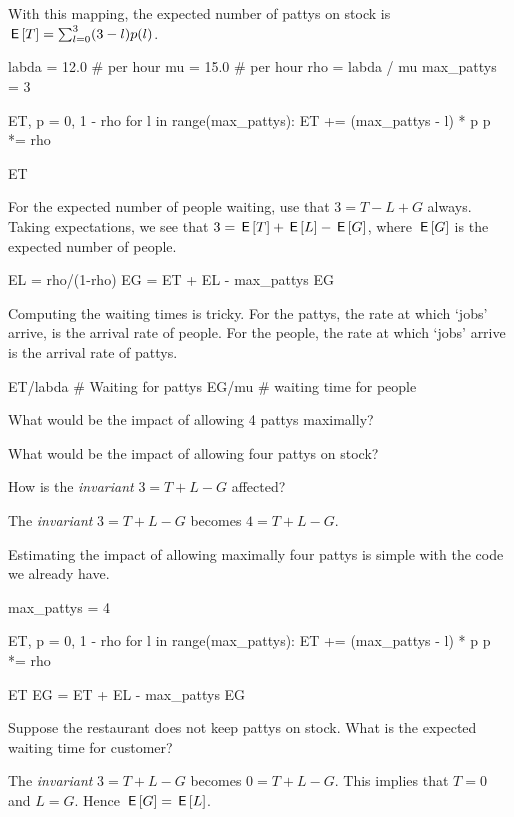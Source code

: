 \documentclass[queueing-book.tex]{subfiles}
\begin{document}
\begin{exercise}
\begin{solution}
With this mapping, the expected number of pattys on stock is $\,\mathsf{E}\left[T\right] =  \sum_{l=0}^3 (3-l)p(l)$.
\begin{pyconsole}[taxis]
labda = 12.0  # per hour
mu = 15.0  # per hour
rho = labda / mu
max_pattys = 3

ET, p = 0, 1 - rho
for l in range(max_pattys):
    ET += (max_pattys - l) * p
    p *= rho

ET
\end{pyconsole}
For the expected number of people waiting, use  that $3=T-L+G$ always.
Taking expectations, we see that $3 = \,\mathsf{E}\left[T\right] + \,\mathsf{E}\left[L\right] - \,\mathsf{E}\left[G\right]$, where $\,\mathsf{E}\left[G\right]$ is the expected number of people.
\begin{pyconsole}[taxis]
EL = rho/(1-rho)
EG = ET + EL - max_pattys
EG
\end{pyconsole}

Computing the waiting times is tricky. For the pattys, the rate at which `jobs' arrive, is the arrival rate of people. For the people, the rate at which `jobs' arrive is the arrival rate of pattys.
\begin{pyconsole}[taxis]
ET/labda # Waiting for pattys
EG/mu # waiting time for people
\end{pyconsole}

What would be the impact of allowing 4 pattys maximally?
\end{solution}
\end{exercise}

\begin{exercise}
What would be the impact of allowing four pattys on stock?
\begin{hint}
How is the \emph{invariant}  $3 = T + L -G$ affected?
\end{hint}
\begin{solution}
The \emph{invariant}  $3 = T + L -G$ becomes $4 = T + L -G$.

Estimating the impact of allowing maximally four pattys is simple with the code we already have.
\begin{pyconsole}[taxis]
max_pattys = 4

ET, p = 0, 1 - rho
for l in range(max_pattys):
    ET += (max_pattys - l) * p
    p *= rho

ET
EG = ET + EL - max_pattys
EG
\end{pyconsole}
\end{solution}
\end{exercise}

\begin{exercise}
Suppose the restaurant does not keep pattys on stock. What is the expected waiting time for customer?
\begin{solution}
The \emph{invariant}  $3 = T + L -G$ becomes $0 = T + L -G$. This implies that $T=0$ and $L=G$.
 Hence $\,\mathsf{E}\left[G\right] = \,\mathsf{E}\left[L\right]$.
\end{solution}
\end{exercise}
\end{document}
